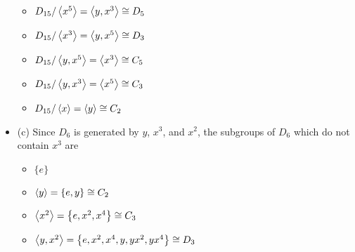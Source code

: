 \documentclass{article}
\begin{document}
\begin{itemize}
\begin{itemize}
            \item $D_{15} / \left\langle x^5 \right\rangle = \left\langle y, x^3 \right\rangle \cong D_5$
            \item $D_{15} / \left\langle x^3 \right\rangle = \left\langle y, x^5 \right\rangle \cong D_3$
            \item $D_{15} / \left\langle y, x^5 \right\rangle = \left\langle x^3 \right\rangle \cong C_5$
            \item $D_{15} / \left\langle y, x^3 \right\rangle = \left\langle x^5 \right\rangle \cong C_3$
            \item $D_{15} / \left\langle x \right\rangle = \left\langle y \right\rangle \cong C_2$
        \end{itemize}
    \item (c) Since $D_6$ is generated by $y$, $x^3$, and $x^2$, the subgroups of $D_6$ which do not contain $x^3$ are
        \begin{itemize}
            \item $\{e\}$
            \item $\left\langle y \right\rangle = \left\{ e, y \right\} \cong C_2$
            \item $\left\langle x^2 \right\rangle = \left\{ e, x^2, x^4 \right\} \cong C_3$
            \item $\left\langle y, x^2 \right\rangle = \left\{ e, x^2, x^4, y, yx^2, yx^4 \right\} \cong D_3$
        \end{itemize}
        
\end{itemize}
\end{document}
